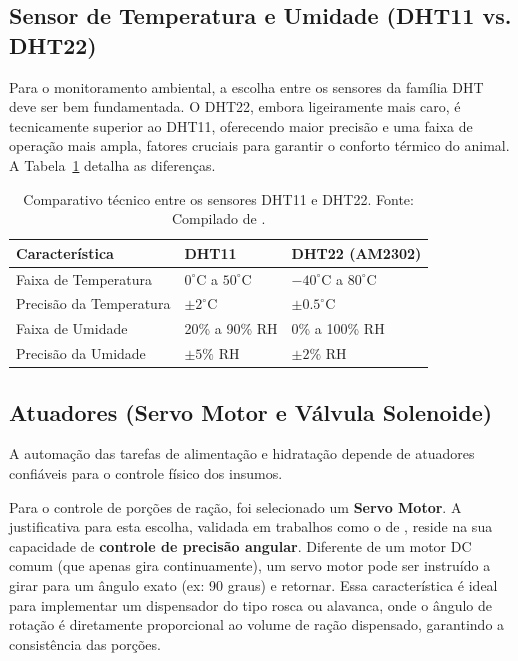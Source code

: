 \subsection{Sensor de Temperatura e Umidade (DHT11 vs. DHT22)}
Para o monitoramento ambiental, a escolha entre os sensores da família DHT deve ser bem fundamentada.
O DHT22, embora ligeiramente mais caro, é tecnicamente superior ao DHT11, oferecendo maior precisão e uma faixa de operação mais ampla, fatores cruciais para garantir o conforto térmico do animal.
A Tabela~\ref{tab:dht_comparison} detalha as diferenças.

\begin{table}[H]
\centering
\caption{Comparativo técnico entre os sensores DHT11 e DHT22.
Fonte: Compilado de \cite{dht_compare_seeed, dht_compare_randomnerd, dht_compare_pcbasic}.}
\label{tab:dht_comparison}
\begin{tabular}{|l|l|l|}
\hline
\textbf{Característica} & \textbf{DHT11} & \textbf{DHT22 (AM2302)} \\ \hline
Faixa de Temperatura & $0^{\circ}$C a $50^{\circ}$C & $-40^{\circ}$C a $80^{\circ}$C \\ \hline
Precisão da Temperatura & $\pm2^{\circ}$C & $\pm0.5^{\circ}$C \\ \hline
Faixa de Umidade & 20\% a 90\% RH & 0\% a 100\% RH \\ \hline
Precisão da Umidade & $\pm5\%$ RH & $\pm2\%$ RH \\ \hline
\end{tabular}
\end{table}

\subsection{Atuadores (Servo Motor e Válvula Solenoide)}

A automação das tarefas de alimentação e hidratação depende de atuadores confiáveis para o controle físico dos insumos.

Para o controle de porções de ração, foi selecionado um \textbf{Servo Motor}. A justificativa para esta escolha, validada em trabalhos como o de \cite{alves2020}, reside na sua capacidade de \textbf{controle de precisão angular}. Diferente de um motor DC comum (que apenas gira continuamente), um servo motor pode ser instruído a girar para um ângulo exato (ex: 90 graus) e retornar. Essa característica é ideal para implementar um dispensador do tipo rosca ou alavanca, onde o ângulo de rotação é diretamente proporcional ao volume de ração dispensado, garantindo a consistência das porções.


